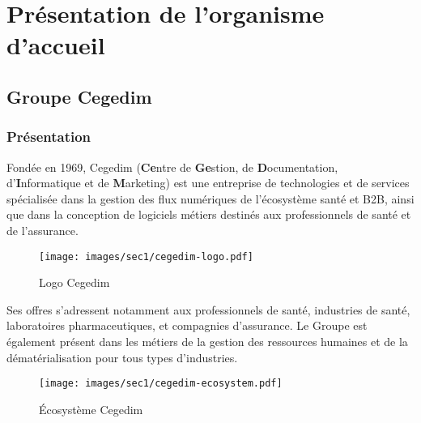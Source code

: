 \section{Présentation de l'organisme d'accueil}
\label{sec:presentation}
\subsection{Groupe Cegedim}
\subsubsection{Présentation}
Fondée en 1969, Cegedim (\textbf{Ce}ntre de \textbf{Ge}stion, de \textbf{D}ocumentation, d’\textbf{I}nformatique et de \textbf{M}arketing) est une entreprise de technologies et de services spécialisée dans la gestion des flux numériques de l’écosystème santé et B2B, ainsi que dans la conception de logiciels métiers destinés aux professionnels de santé et de l’assurance.\\

\begin{figure}[H]
    \centering
    \texttt{[image: images/sec1/cegedim-logo.pdf]}
    \caption{Logo Cegedim}
\end{figure}

Ses offres s’adressent notamment aux professionnels de santé, industries de santé, laboratoires pharmaceutiques, et compagnies d’assurance. Le Groupe est également présent dans les métiers de la gestion des ressources humaines et de la dématérialisation pour tous types d’industries.
\begin{figure}[H]
    \centering
    \texttt{[image: images/sec1/cegedim-ecosystem.pdf]}
    \caption{Écosystème Cegedim}
\end{figure}
